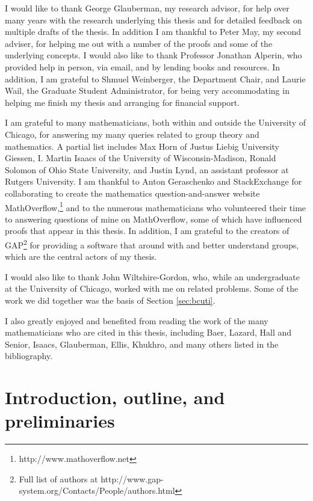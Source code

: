 \documentclass{ucetd}
\newcommand{\url}[1]{#1}
\begin{document}
\acknowledgments

I would like to thank George Glauberman, my research advisor, for help
over many years with the research underlying this thesis and for
detailed feedback on multiple drafts of the thesis. In addition I am
thankful to Peter May, my second adviser, for helping me out with a
number of the proofs and some of the underlying concepts. I would also
like to thank Professor Jonathan Alperin, who provided help in person,
via email, and by lending books and resources. In addition, I am
grateful to Shmuel Weinberger, the Department Chair, and Laurie Wail,
the Graduate Student Administrator, for being very accommodating in
helping me finish my thesis and arranging for financial support.

I am grateful to many mathematicians, both within and outside the
University of Chicago, for answering my many queries related to group
theory and mathematics. A partial list includes Max Horn of Justus
Liebig University Giessen, I. Martin Isaacs of the University of
Wisconsin-Madison, Ronald Solomon of Ohio State University, and Justin
Lynd, an assistant professor at Rutgers University. I am thankful to
Anton Geraschenko and StackExchange for collaborating to create the
mathematics question-and-answer website
MathOverflow,\footnote{\url{http://www.mathoverflow.net}} and to the
numerous mathematicians who volunteered their time to answering
questions of mine on MathOverflow, some of which have influenced
proofs that appear in this thesis. In addition, I am grateful to the
creators of GAP\footnote{Full list of authors at
  \url{http://www.gap-system.org/Contacts/People/authors.html}} for
providing a software that around with and better understand groups,
which are the central actors of my thesis.

I would also like to thank John Wiltshire-Gordon, who, while an
undergraduate at the University of Chicago, worked with me on related
problems. Some of the work we did together was the basis of Section
\ref{sec:bcuti}.

I also greatly enjoyed and benefited from reading the work of the many
mathematicians who are cited in this thesis, including Baer, Lazard,
Hall and Senior, Isaacs, Glauberman, Ellis, Khukhro, and many others
listed in the bibliography.

\mainmatter

\chapter{Introduction, outline, and preliminaries}
\end{document}
